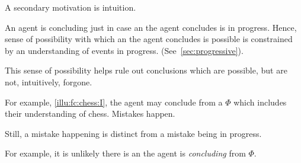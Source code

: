 \begin{note}
  A secondary motivation is intuition.

  An agent is concluding just in case an  the agent concludes is in progress.
  Hence, sense of possibility with which an  the agent concludes is possible is constrained by an understanding of events in progress.
  (See~\autoref{sec:progressive}).

  This sense of possibility helps rule out conclusions which are possible, but are not, intuitively, forgone.

  For example, \autoref{illu:fc:chess:I}, the agent may conclude  from a \pool{} \(\Phi\) which includes their understanding of chess.
  Mistakes happen.

  Still, a mistake happening is distinct from a mistake being in progress.

  For example, it is unlikely there is an  the agent is \emph{concluding}  from \(\Phi\).
\end{note}


